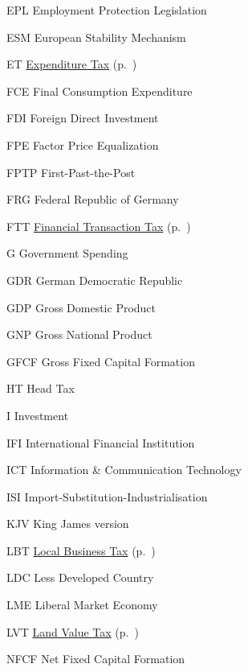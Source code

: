 	{EPL}
	{Employment Protection Legislation}

	{ESM}
	{European Stability Mechanism}

	{ET}
	{\hyperref[sec:ET]{Expenditure Tax} (p.~\pageref{sec:ET})}

	{FCE}
	{Final Consumption Expenditure}

	{FDI}
	{Foreign Direct Investment}

	{FPE}
	{Factor Price Equalization}

	{FPTP}
	{First-Past-the-Post}

	{FRG}
	{Federal Republic of Germany}

	{FTT}
	{\hyperref[sec:FTT]{Financial Transaction Tax} (p.~\pageref{sec:FTT})}

	{G}
	{Government Spending}

	{GDR}
	{German Democratic Republic}

	{GDP}
	{Gross Domestic Product}

	{GNP}
	{Gross National Product}

	{GFCF}
	{Gross Fixed Capital Formation}

	{HT}
	{Head Tax}

	{I}
	{Investment}

	{IFI}
	{International Financial Institution}

	{ICT}
	{Information \& Communication Technology}

	{ISI}
	{Import-Substitution-Industrialisation}

	{KJV}
	{King James version}

	{LBT}
	{\hyperref[sec:LBT]{Local Business Tax} (p.~\pageref{sec:LBT})}

	{LDC}
	{Less Developed Country}

	{LME}
	{Liberal Market Economy}

	{LVT}
	{\hyperref[sec:LVT]{Land Value Tax} (p.~\pageref{sec:LVT})}

	{NFCF}
	{Net Fixed Capital Formation}

